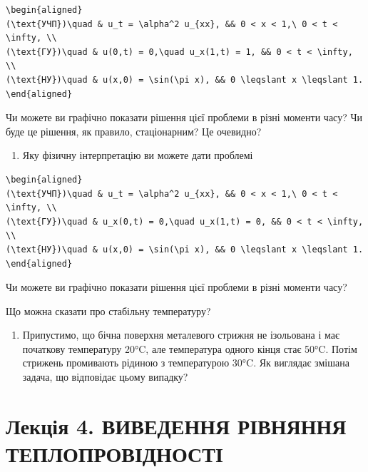 \documentclass[
  ukrainian,
]{article}
\providecommand{\tightlist}{%
  \setlength{\itemsep}{0pt}\setlength{\parskip}{0pt}}
\begin{document}
\begin{verbatim}
\begin{aligned}
(\text{УЧП})\quad & u_t = \alpha^2 u_{xx}, && 0 < x < 1,\ 0 < t < \infty, \\
(\text{ГУ})\quad & u(0,t) = 0,\quad u_x(1,t) = 1, && 0 < t < \infty, \\
(\text{НУ})\quad & u(x,0) = \sin(\pi x), && 0 \leqslant x \leqslant 1.
\end{aligned}
\end{verbatim}

Чи можете ви графічно показати рішення цієї проблеми в різні моменти
часу? Чи буде це рішення, як правило, стаціонарним? Це очевидно?

\begin{enumerate}
\def\labelenumi{\arabic{enumi}.}
\setcounter{enumi}{2}
\tightlist
\item
  Яку фізичну інтерпретацію ви можете дати проблемі
\end{enumerate}

\begin{verbatim}
\begin{aligned}
(\text{УЧП})\quad & u_t = \alpha^2 u_{xx}, && 0 < x < 1,\ 0 < t < \infty, \\
(\text{ГУ})\quad & u_x(0,t) = 0,\quad u_x(1,t) = 0, && 0 < t < \infty, \\
(\text{НУ})\quad & u(x,0) = \sin(\pi x), && 0 \leqslant x \leqslant 1.
\end{aligned}
\end{verbatim}

Чи можете ви графічно показати рішення цієї проблеми в різні моменти
часу?

Що можна сказати про стабільну температуру?

\begin{enumerate}
\def\labelenumi{\arabic{enumi}.}
\setcounter{enumi}{3}
\tightlist
\item
  Припустимо, що бічна поверхня металевого стрижня не ізольована і має
  початкову температуру 20°C, але температура одного кінця стає 50°C.
  Потім стрижень промивають рідиною з температурою 30°C. Як виглядає
  змішана задача, що відповідає цьому випадку?
\end{enumerate}

\section{Лекція 4. ВИВЕДЕННЯ РІВНЯННЯ
ТЕПЛОПРОВІДНОСТІ}\label{ux43bux435ux43aux446ux456ux44f-4.-ux432ux438ux432ux435ux434ux435ux43dux43dux44f-ux440ux456ux432ux43dux44fux43dux43dux44f-ux442ux435ux43fux43bux43eux43fux440ux43eux432ux456ux434ux43dux43eux441ux442ux456}
\end{document}
